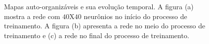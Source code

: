 \begin{figure}[H]
	\centering
	\qquad
	\qquad
	\qquad
	\caption{Mapas auto-organizáveis e sua evolução temporal. A figura (a) mostra a rede com $40$X$40$ neurônios no início do processo de treinamento. A figura (b) apresenta a rede no meio do processo de treinamento e (c) a rede no final do processo de treinamento.}
	\label{SOMt03}
\end{figure}

